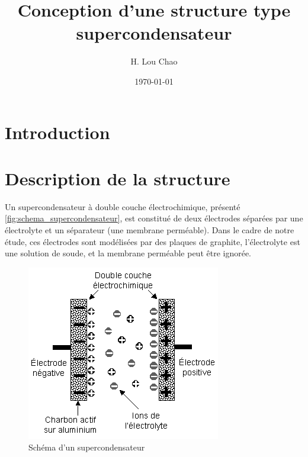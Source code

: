 \documentclass[a4paper, 11pt]{article}
\title{Conception d'une structure type supercondensateur}
\author{H. Lou Chao}
\date{\today}
\begin{document}
\maketitle
\tableofcontents


\section*{Introduction}


\section{Description de la structure}

Un supercondensateur à double couche électrochimique, présenté \autoref{fig:schema_supercondensateur}, est constitué de deux électrodes séparées par une électrolyte et un séparateur (une membrane perméable). Dans le cadre de notre étude, ces électrodes sont modélisées par des plaques de graphite, l'électrolyte est une solution de soude, et la membrane perméable peut être ignorée.

\begin{figure}[bpht]
    \centering
    \includegraphics[scale=0.5]{schema_supercondensateur.png}
    \caption{Schéma d'un supercondensateur}
    \label{fig:schema_supercondensateur}
\end{figure}
\end{document}
